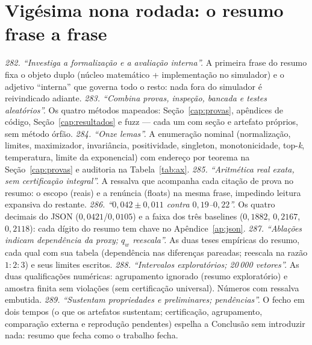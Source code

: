 \section{Vigésima nona rodada: o resumo frase a frase}
\textit{282. ``Investiga a formalização e a avaliação interna''.} A primeira frase do resumo fixa o objeto duplo (núcleo matemático + implementação no simulador) e o adjetivo ``interna'' que governa todo o resto: nada fora do simulador é reivindicado adiante.
\textit{283. ``Combina provas, inspeção, bancada e testes aleatórios''.} Os quatro métodos mapeados: Seção~\ref{cap:provas}, apêndices de código, Seção~\ref{cap:resultados} e fuzz --- cada um com seção e artefato próprios, sem método órfão.
\textit{284. ``Onze lemas''.} A enumeração nominal (normalização, limites, maximizador, invariância, positividade, singleton, monotonicidade, top-\textit{k}, temperatura, limite da exponencial) com endereço por teorema na Seção~\ref{cap:provas} e auditoria na Tabela~\ref{tab:ax}.
\textit{285. ``Aritmética real exata, sem certificação integral''.} A ressalva que acompanha cada citação de prova no resumo: o escopo (reais) e a renúncia (floats) na mesma frase, impedindo leitura expansiva do restante.
\textit{286. ``$0{,}042\pm0{,}011$ contra $0{,}19$--$0{,}22$''.} Os quatro decimais do JSON ($0{,}0421$/$0{,}0105$) e a faixa dos três baselines ($0{,}1882$, $0{,}2167$, $0{,}2118$): cada dígito do resumo tem chave no Apêndice~\ref{ap:json}.
\textit{287. ``Ablações indicam dependência da proxy; $q_w$ reescala''.} As duas teses empíricas do resumo, cada qual com sua tabela (dependência nas diferenças pareadas; reescala na razão $1{:}2{:}3$) e seus limites escritos.
\textit{288. ``Intervalos exploratórios; 20\,000 vetores''.} As duas qualificações numéricas: agrupamento ignorado (resumo exploratório) e amostra finita sem violações (sem certificação universal). Números com ressalva embutida.
\textit{289. ``Sustentam propriedades e preliminares; pendências''.} O fecho em dois tempos (o que os artefatos sustentam; certificação, agrupamento, comparação externa e reprodução pendentes) espelha a Conclusão sem introduzir nada: resumo que fecha como o trabalho fecha.
